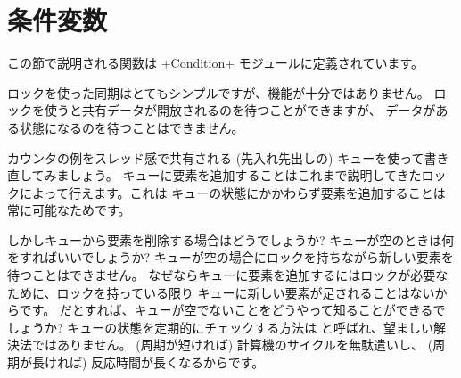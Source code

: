 \section{条件変数}

この節で説明される関数は \ml+Condition+ モジュールに定義されています。

ロックを使った同期はとてもシンプルですが、機能が十分ではありません。
ロックを使うと共有データが開放されるのを待つことができますが、
データがある状態になるのを待つことはできません。

カウンタの例をスレッド感で共有される (先入れ先出しの) キューを使って書き直してみましょう。
キューに要素を追加することはこれまで説明してきたロックによって行えます。これは
キューの状態にかかわらず要素を追加することは常に可能なためです。

しかしキューから要素を削除する場合はどうでしょうか?
キューが空のときは何をすればいいでしょうか?
キューが空の場合にロックを持ちながら新しい要素を待つことはできません。
なぜならキューに要素を追加するにはロックが必要なために、ロックを持っている限り
キューに新しい要素が足されることはないからです。
だとすれば、キューが空でないことをどうやって知ることができるでしょうか?
キューの状態を定期的にチェックする方法は  と呼ばれ、望ましい解決法ではありません。
(周期が短ければ) 計算機のサイクルを無駄遣いし、 (周期が長ければ) 反応時間が長くなるからです。

